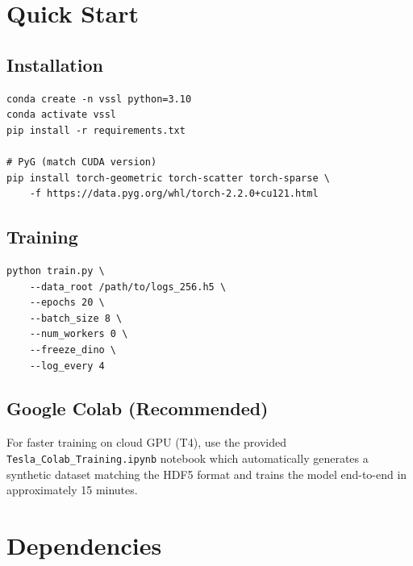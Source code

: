 \documentclass[12pt,a4paper]{article}
\begin{document}
\section{Quick Start}

\subsection{Installation}

\begin{lstlisting}[style=bashstyle, caption={Environment setup}]
conda create -n vssl python=3.10
conda activate vssl
pip install -r requirements.txt

# PyG (match CUDA version)
pip install torch-geometric torch-scatter torch-sparse \
    -f https://data.pyg.org/whl/torch-2.2.0+cu121.html
\end{lstlisting}

\subsection{Training}

\begin{lstlisting}[style=bashstyle, caption={Launch SSL pretraining}]
python train.py \
    --data_root /path/to/logs_256.h5 \
    --epochs 20 \
    --batch_size 8 \
    --num_workers 0 \
    --freeze_dino \
    --log_every 4
\end{lstlisting}

\subsection{Google Colab (Recommended)}

For faster training on cloud GPU (T4), use the provided \texttt{Tesla\_Colab\_Training.ipynb}
notebook which automatically generates a synthetic dataset matching the HDF5 format and
trains the model end-to-end in approximately 15 minutes.

\section{Dependencies}
\end{document}
